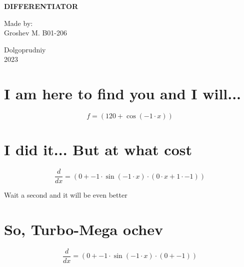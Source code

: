 \documentclass[a4paper, 12pt]{article}
\title{}
\date{}
\begin{document}

    \begin{titlepage}
    \maketitle
    \thispagestyle{empty}

            \begin{center}
                  \Large \textbf{DIFFERENTIATOR}
            \end{center}

             \vspace{20em}
             \begin{flushright}
                 \normalsize Made by: \\
                             Groshev M. B01-206
             \end{flushright}

             \begin{center}
                    \vfill \normalsize Dolgoprudniy \\ 2023
             \end{center}
    \end{titlepage}


\section{I am here to find you and I will...}\begin{equation*}
    f = ({{120}}+{\cos({{{-1}}\cdot{{x}}})})
\end{equation*}

\section{I did it... But at what cost}\begin{equation*}
    \frac{d}{dx} = ({{0}}+{{{{-1}}\cdot{\sin({{{-1}}\cdot{{x}}})}}\cdot{({{{0}}\cdot{{x}}}+{{{1}}\cdot{{-1}}})}})
\end{equation*}


 Wait a second and it will be even better
\section{So, Turbo-Mega ochev}\begin{equation*}
    \frac{d}{dx} = ({{0}}+{{{{-1}}\cdot{\sin({{{-1}}\cdot{{x}}})}}\cdot{({{0}}+{{-1}})}})
\end{equation*}
\end{document}
